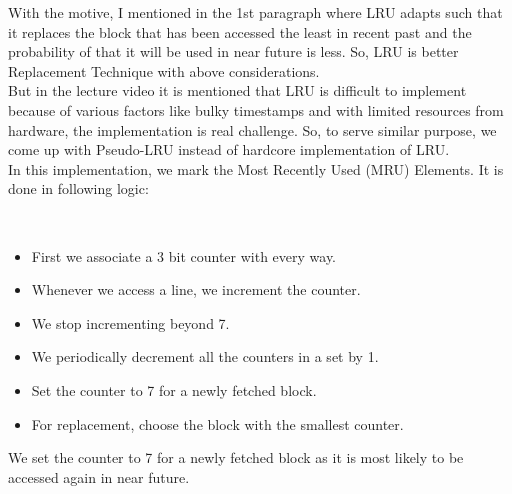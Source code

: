 \documentclass[12pt]{article}
\begin{document}
With the motive, I mentioned in the 1st paragraph where LRU adapts such that it replaces the block that has been accessed the least in recent past and the probability of that it will be used in near future is less. So, LRU is better Replacement Technique with above considerations. \\

But in the lecture video it is mentioned that LRU is difficult to implement because of various factors like bulky timestamps and with limited resources from hardware, the implementation is real challenge. So, to serve similar purpose, we come up with Pseudo-LRU instead of hardcore implementation of LRU. \\

In this implementation, we mark the Most Recently Used (MRU) Elements. It is done in following logic:
\begin{verbatim}
    
\end{verbatim}
\begin{itemize}
    \item First we associate a 3 bit counter with every way.
    \item Whenever we access a line, we increment the counter.
    \item We stop incrementing beyond 7.
    \item We periodically decrement all the counters in a set by 1.
    \item Set the counter to 7 for a newly fetched block.
    \item For replacement, choose the block with the smallest counter.
\end{itemize}

We set the counter to 7 for a newly fetched block as it is most likely to be accessed again in near future.
\end{document}
